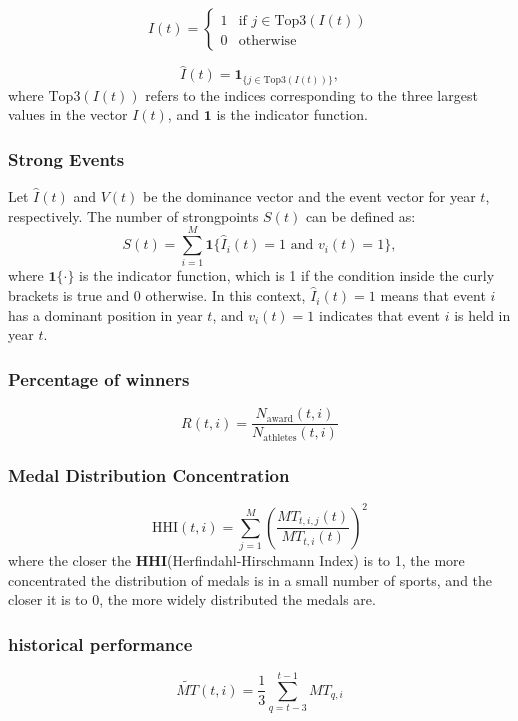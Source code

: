 \documentclass{mcmthesis}
\begin{document}
\[
\hat{I}(t) = 
\begin{cases} 
	1 & \text{if } j \in \text{Top3}(I(t)) \\
	0 & \text{otherwise}
\end{cases}
\]

\[\hat{I}(t) = \mathbf{1}_{\{ j \in \text{Top3}(I(t)) \}},\]
where \( \text{Top3}(I(t)) \) refers to the indices corresponding to the three largest values in the vector \( I(t) \), and \( \mathbf{1} \) is the indicator function.

	
	\subsubsection{Strong Events}
	
	Let \( \hat{I}(t) \) and \( V(t) \) be the dominance vector and the event vector for year \( t \), respectively. The number of strongpoints \( S(t) \) can be defined as:
	\[
	S(t) = \sum_{i=1}^{M} \mathbf{1}\{ \hat{I}_i(t) = 1 \text{ and } v_i(t) = 1 \},
	\]
	where \( \mathbf{1}\{ \cdot \} \) is the indicator function, which is 1 if the condition inside the curly brackets is true and 0 otherwise. 
	In this context, \( \hat{I}_i(t) = 1 \) means that event \( i \) has a dominant position in year \( t \), and \( v_i(t) = 1 \) indicates that event \( i \) is held in year \( t \).
	
	
	\subsubsection{Percentage of winners}
	\[R(t,i) = \frac{N_{\text{award}}(t,i)}{N_{\text{athletes}}(t,i)}\]
	
	\subsubsection{Medal Distribution Concentration}
\[
\text{HHI}(t,i) = \sum_{j=1}^{M} \left( \frac{MT_{t,i,j}(t)}{MT_{t,i}(t)} \right)^2
\]
where the closer the \textbf{HHI}(Herfindahl-Hirschmann Index)\cite{HHI2016} is to 1, the more concentrated the distribution of medals is in a small number of sports, and the closer it is to 0, the more widely distributed the medals are.

	\subsubsection{historical performance}
	
	\[
	\widetilde{MT}(t,i) = \frac{1}{3} \sum_{q=t-3}^{t-1} MT_{q,i}
	\]
	
\end{document}
